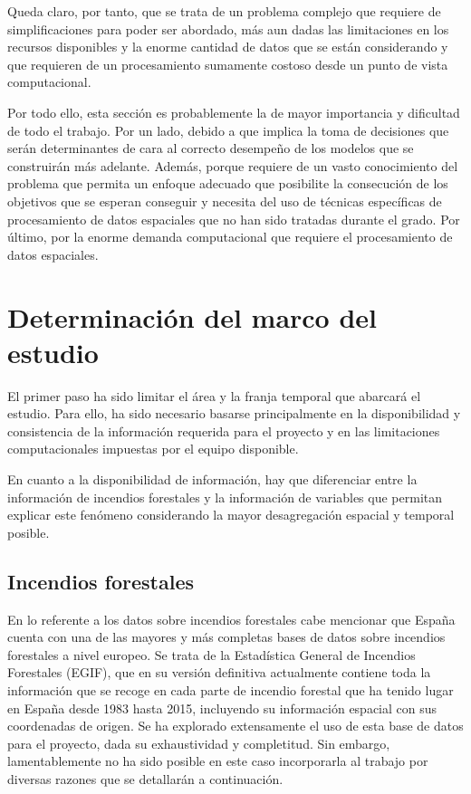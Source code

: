 \documentclass[12pt,a4paper,]{book}
\numberwithin{dummy}{section}
\theoremstyle{ocrenumbox}
\theoremstyle{blacknumex}
\theoremstyle{blacknumbox}
\theoremstyle{ocrenum}
\theoremstyle{ocrenum}
\begin{document}
Queda claro, por tanto, que se trata de un problema complejo que
requiere de simplificaciones para poder ser abordado, más aun dadas las
limitaciones en los recursos disponibles y la enorme cantidad de datos
que se están considerando y que requieren de un procesamiento sumamente
costoso desde un punto de vista computacional.

Por todo ello, esta sección es probablemente la de mayor importancia y
dificultad de todo el trabajo. Por un lado, debido a que implica la toma
de decisiones que serán determinantes de cara al correcto desempeño de
los modelos que se construirán más adelante. Además, porque requiere de
un vasto conocimiento del problema que permita un enfoque adecuado que
posibilite la consecución de los objetivos que se esperan conseguir y
necesita del uso de técnicas específicas de procesamiento de datos
espaciales que no han sido tratadas durante el grado. Por último, por la
enorme demanda computacional que requiere el procesamiento de datos
espaciales.

\hypertarget{determinaciuxf3n-del-marco-del-estudio}{%
\section{Determinación del marco del
estudio}\label{determinaciuxf3n-del-marco-del-estudio}}

El primer paso ha sido limitar el área y la franja temporal que abarcará
el estudio. Para ello, ha sido necesario basarse principalmente en la
disponibilidad y consistencia de la información requerida para el
proyecto y en las limitaciones computacionales impuestas por el equipo
disponible.

En cuanto a la disponibilidad de información, hay que diferenciar entre
la información de incendios forestales y la información de variables que
permitan explicar este fenómeno considerando la mayor desagregación
espacial y temporal posible.

\hypertarget{incendios-forestales}{%
\subsection{Incendios forestales}\label{incendios-forestales}}

En lo referente a los datos sobre incendios forestales cabe mencionar
que España cuenta con una de las mayores y más completas bases de datos
sobre incendios forestales a nivel europeo. Se trata de la Estadística
General de Incendios Forestales (EGIF), que en su versión definitiva
actualmente contiene toda la información que se recoge en cada parte de
incendio forestal que ha tenido lugar en España desde 1983 hasta 2015,
incluyendo su información espacial con sus coordenadas de origen. Se ha
explorado extensamente el uso de esta base de datos para el proyecto,
dada su exhaustividad y completitud. Sin embargo, lamentablemente no ha
sido posible en este caso incorporarla al trabajo por diversas razones
que se detallarán a continuación.
\end{document}
